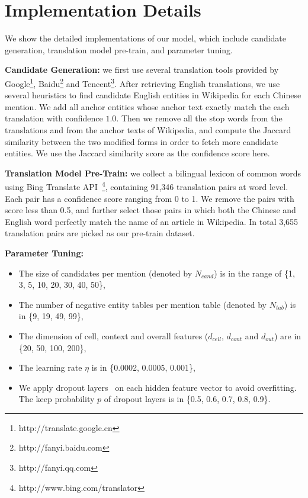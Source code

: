 \section{Implementation Details}
\label{sec:impl-detail}

We show the detailed implementations of our model, which include 
candidate generation, translation model pre-train, and parameter tuning.

\noindent
\textbf{Candidate Generation:}
we first use several translation tools provided by
Google\footnote{http://translate.google.cn},
Baidu\footnote{http://fanyi.baidu.com} and
Tencent\footnote{http://fanyi.qq.com}. 
After retrieving English translations, we use several heuristics
to find candidate English entities in Wikipedia for each Chinese mention.
We add all anchor entities whose anchor text exactly match the each 
translation with confidence $1.0$. Then we remove all the stop words from 
the translations and from the anchor texts of Wikipedia, and compute the 
Jaccard similarity between the two modified forms in order to fetch more 
candidate entities. We use the Jaccard similarity score as the confidence
score here.

\noindent
\textbf{Translation Model Pre-Train:}
we collect a bilingual lexicon of common words using
Bing Translate API~\footnote{http://www.bing.com/translator},
containing 91,346 translation pairs at word level.
Each pair has a confidence score ranging from 0 to 1.
We remove the pairs with score less than 0.5,
and further select those pairs in which both the Chinese and English word
perfectly match the name of an article in Wikipedia.
In total 3,655 translation pairs are picked as our pre-train dataset.

\noindent
\textbf{Parameter Tuning:}
\begin{itemize}
\item The size of candidates per mention (denoted by $N_{cand}$) is
in the range of \{1, 3, 5, 10, 20, 30, 40, 50\}, 
\item The number of negative entity tables per mention table (denoted by $N_{tab}$) is in \{9, 19, 49, 99\},
\item The dimension of cell, context and overall features ($d_{cell}$, $d_{cont}$ and $d_{out}$) are in \{20, 50, 100, 200\},
\item The learning rate $\eta$ is in \{0.0002, 0.0005, 0.001\},
\item We apply dropout layers~\cite{srivastava2014dropout} on each hidden feature vector to avoid overfitting.
The keep probability $p$ of dropout layers is in \{0.5, 0.6, 0.7, 0.8, 0.9\}.
\end{itemize}



